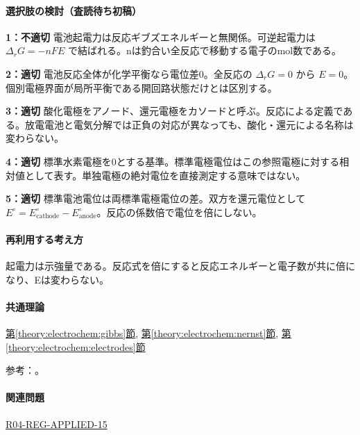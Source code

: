 \paragraph{選択肢の検討（査読待ち初稿）}\mbox{}\par

\noindent\textbf{1：不適切} 電池起電力は反応ギブズエネルギーと無関係。可逆起電力は \(\Delta_rG=-nFE\) で結ばれる。nは釣合い全反応で移動する電子のmol数である。\par

\noindent\textbf{2：適切} 電池反応全体が化学平衡なら電位差0。全反応の \(\Delta_rG=0\) から \(E=0\)。個別電極界面が局所平衡である開回路状態だけとは区別する。\par

\noindent\textbf{3：適切} 酸化電極をアノード、還元電極をカソードと呼ぶ。反応による定義である。放電電池と電気分解では正負の対応が異なっても、酸化・還元による名称は変わらない。\par

\noindent\textbf{4：適切} 標準水素電極を0とする基準。標準電極電位はこの参照電極に対する相対値として表す。単独電極の絶対電位を直接測定する意味ではない。\par

\noindent\textbf{5：適切} 標準電池電位は両標準電極電位の差。双方を還元電位として \(E^\circ=E^\circ_{\mathrm{cathode}}-E^\circ_{\mathrm{anode}}\)。反応の係数倍で電位を倍にしない。\par

\paragraph{再利用する考え方} 起電力は示強量である。反応式を倍にすると反応エネルギーと電子数が共に倍になり、Eは変わらない。

\paragraph{共通理論} \hyperref[theory:electrochem:gibbs]{第\ref*{theory:electrochem:gibbs}節}, \hyperref[theory:electrochem:nernst]{第\ref*{theory:electrochem:nernst}節}, \hyperref[theory:electrochem:electrodes]{第\ref*{theory:electrochem:electrodes}節}

\par 参考：\cite{openstax_cell_gibbs,mit_redox2014}。

\paragraph{関連問題} \hyperref[q:r04-reg-applied-15]{R04-REG-APPLIED-15}


